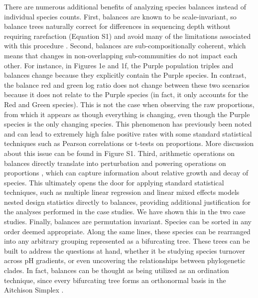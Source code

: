  There are numerous additional benefits of analyzing species balances instead of individual species counts.  First, balances are known to be scale-invariant, so balance trees naturally correct for differences in sequencing depth without requiring rarefaction (Equation S1) and avoid many of the limitations associated with this procedure \cite{waste_not}. Second, balances are sub-compositionally coherent, which means that changes in non-overlapping sub-communities do not impact each other.  For instance, in Figures 1e and 1f, the Purple population triples and balances change because they explicitly contain the Purple species.  In contrast, the balance red and green log ratio does not change between these two scenarios because it does not relate to the Purple species (in fact, it only accounts for the Red and Green species).  This is not the case when observing the raw proportions, from which it appears as though everything is changing, even though the Purple species is the only changing species.  This phenomenon has previously been noted \cite{ancom} and can lead to extremely high false positive rates with some standard statistical techniques such as Pearson correlations or t-tests on proportions.  More discussion about this issue can be found in Figure S1. Third, arithmetic operations on balances directly translate into perturbation and powering operations on proportions \cite{ilr, Pawlowsky-Glahn2015-qb}, which can capture information about relative growth and decay of species.  This ultimately opens the door for applying standard statistical techniques, such as multiple linear regression \cite{c24} and linear mixed effects models nested design statistics directly to balances, providing additional justification for the analyses performed in the case studies.  We have shown this in the two case studies.  Finally, balances are permutation invariant.  Species can be sorted in any order deemed appropriate.  Along the same lines, these species can be rearranged into any arbitrary grouping represented as a bifurcating tree.  These trees can be built to address the questions at hand, whether it be studying species turnover across pH gradients, or even uncovering the relationships between phylogenetic clades.  In fact, balances can be thought as being utilized as an ordination technique, since every bifurcating tree forms an orthonormal basis in the Aitchison Simplex \cite{groups_of_parts}.\par
